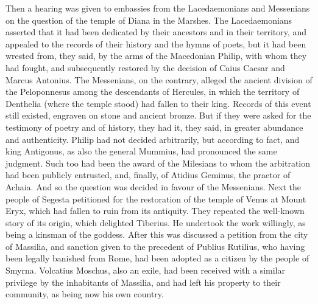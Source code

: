 
Then a hearing was given to embassies from the Lacedaemonians and Messenians on the question of the temple of Diana in the Marshes. The Lacedaemonians asserted that it had been dedicated by their ancestors and in their territory, and appealed to the records of their history and the hymns of poets, but it had been wrested from, they said, by the arms of the Macedonian Philip, with whom they had fought, and subsequently restored by the decision of Caius Caesar and Marcus Antonius. The Messenians, on the contrary, alleged the ancient division of the Peloponnesus among the descendants of Hercules, in which the territory of Denthelia (where the temple stood) had fallen to their king. Records of this event still existed, engraven on stone and ancient bronze. But if they were asked for the testimony of poetry and of history, they had it, they said, in greater abundance and authenticity. Philip had not decided arbitrarily, but according to fact, and king Antigonus, as also the general Mummius, had pronounced the same judgment. Such too had been the award of the Milesians to whom the arbitration had been publicly entrusted, and, finally, of Atidius Geminus, the praetor of Achaia. And so the question was decided in favour of the Messenians. Next the people of Segesta petitioned for the restoration of the temple of Venus at Mount Eryx, which had fallen to ruin from its antiquity. They repeated the well-known story of its origin, which delighted Tiberius. He undertook the work willingly, as being a kinsman of the goddess. After this was discussed a petition from the city of Massilia, and sanction given to the precedent of Publius Rutilius, who having been legally banished from Rome, had been adopted as a citizen by the people of Smyrna. Volcatius Moschus, also an exile, had been received with a similar privilege by the inhabitants of Massilia, and had left his property to their community, as being now his own country.


